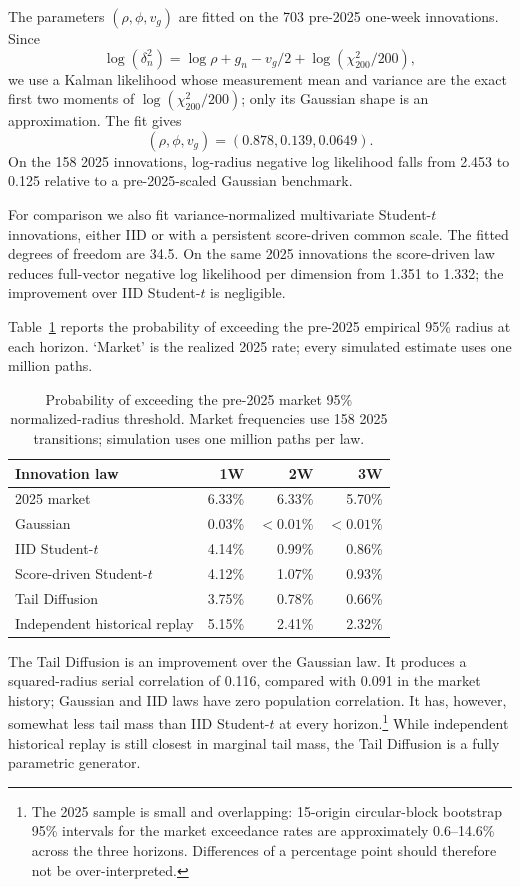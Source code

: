 \documentclass[11pt,a4paper]{article}
\begin{document}
The parameters $(\rho,\phi,v_g)$ are fitted on the 703 pre-2025 one-week
innovations.  Since
\begin{equation}
  \log (\delta_n^2)
  =\log\rho+g_n-v_g/2+\log(\chi^2_{200}/200),
  \label{eq:sv-log-radius}
\end{equation}
we use a Kalman likelihood whose measurement mean and variance are the exact
first two moments of $\log(\chi^2_{200}/200)$; only its Gaussian shape is an
approximation.  The fit gives
\[
  (\rho,\phi,v_g)=(0.878,0.139,0.0649).
\]
On the 158 2025 innovations,
log-radius negative log likelihood falls from 2.453 to 0.125 relative to a
pre-2025-scaled Gaussian benchmark.

For comparison we also fit variance-normalized multivariate Student-$t$
innovations, either IID or with a persistent score-driven common scale.  The
fitted degrees of freedom are 34.5.  On the same 2025 innovations the
score-driven law reduces full-vector negative log likelihood per dimension
from 1.351 to 1.332; the improvement over IID Student-$t$ is negligible.

Table~\ref{tab:tails} reports the probability of exceeding the pre-2025
empirical 95\% radius at each horizon.  `Market' is the realized 2025 rate;
every simulated estimate uses one million paths.

\begin{table}[H]
\centering
\small
\begin{tabular}{lrrr}
\toprule
Innovation law & 1W & 2W & 3W\\
\midrule
2025 market & 6.33\% & 6.33\% & 5.70\%\\
Gaussian & 0.03\% & $<0.01\%$ & $<0.01\%$\\
IID Student-$t$ & 4.14\% & 0.99\% & 0.86\%\\
Score-driven Student-$t$ & 4.12\% & 1.07\% & 0.93\%\\
Tail Diffusion & 3.75\% & 0.78\% & 0.66\%\\
Independent historical replay & 5.15\% & 2.41\% & 2.32\%\\
\bottomrule
\end{tabular}
\caption{Probability of exceeding the pre-2025 market 95\% normalized-radius
threshold.  Market frequencies use 158 2025 transitions; simulation uses one
million paths per law.}
\label{tab:tails}
\end{table}

The Tail Diffusion is an improvement over the Gaussian law. 
 It produces a squared-radius serial correlation of 0.116,
compared with 0.091 in the market history; Gaussian and IID laws have zero
population correlation. It has, however, somewhat less tail mass than IID Student-$t$ at every horizon.\footnote{The 2025
sample is small and overlapping: 15-origin circular-block bootstrap 95\%
intervals for the market exceedance rates are approximately 0.6--14.6\%
across the three horizons.  Differences of a percentage point
should therefore not be over-interpreted.  } While independent historical replay is
still closest in marginal tail mass, the Tail Diffusion is a fully
parametric generator.
\end{document}
